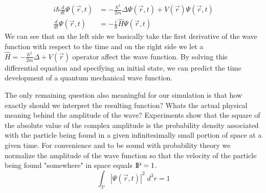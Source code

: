 \begin{equation}
	\label{eq::schrodinger_general}
	\begin{split}
		i \hbar \frac{d}{dt}\Psi(\vec{r}, t) &= - \frac{\hbar^2}{2m}\Delta\Psi(\vec{r}, t) + V(\vec{r})\Psi(\vec{r}, t)\\
		\frac{d}{dt}\Psi(\vec{r}, t) &= -\frac{i}{\hbar}\hat{H}\Psi(\vec{r}, t)
	\end{split}
\end{equation}
We can see that on the left side we basically take the first derivative of the wave function with respect to the time and on the right side we let a $\hat{H} = -\frac{\hbar^2}{2m}\Delta + V(\vec{r})$ operator affect the wave function.
By solving this differential equation and specifying an initial state, we can predict the time development of a quantum mechanical wave function.

The only remaining question also meaningful for our simulation is that how exactly should we interpret the resulting function?
Whats the actual physical meaning behind the amplitude of the wave?
Experiments show that the square of the absolute value of the complex amplitude is the probability density associated with the particle being found in a given infinitesimally small portion of space at a given time.
For convenience and to be sound with probability theory we normalize the amplitude of the wave function so that the velocity of the particle being found "somewhere" in space equals $\text{I\kern-0.15em P} = 1$.
\begin{equation}
	\label{eq:normalization}
	\int_\mathcal{V} |\Psi(\vec{r}, t)|^2 \;d^3r = 1
\end{equation}



